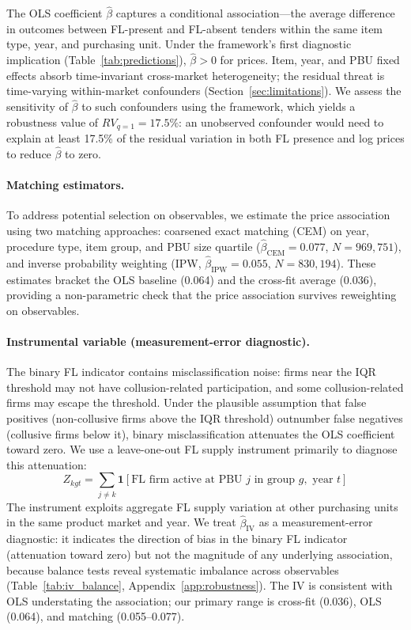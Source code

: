 The OLS coefficient $\hat{\beta}$ captures a conditional
association---the average difference in outcomes between FL-present and
FL-absent tenders within the same item type, year, and purchasing unit.
Under the framework's first diagnostic implication (Table~\ref{tab:predictions}), $\hat{\beta} > 0$ for prices.
Item, year, and PBU fixed effects absorb time-invariant cross-market
heterogeneity; the residual threat is time-varying within-market
confounders (Section~\ref{sec:limitations}). We assess the sensitivity
of $\hat{\beta}$ to such confounders using the
\citet{cinelli2020making} framework, which yields a robustness value
of $RV_{q=1} = 17.5\%$: an unobserved confounder would need to
explain at least 17.5\% of the residual variation in both FL presence
and log prices to reduce $\hat{\beta}$ to zero.

\paragraph{Matching estimators.}
To address potential selection on observables, we estimate the
price association using two matching approaches: coarsened exact
matching (CEM) on year, procedure type, item group, and PBU size
quartile ($\hat{\beta}_{\text{CEM}} = 0.077$, $N = 969{,}751$), and
inverse probability weighting (IPW, $\hat{\beta}_{\text{IPW}} = 0.055$,
$N = 830{,}194$). These estimates bracket the OLS baseline (0.064)
and the cross-fit average (0.036), providing a non-parametric check
that the price association survives reweighting on observables.

\paragraph{Instrumental variable (measurement-error diagnostic).}
The binary FL indicator contains misclassification noise: firms near
the IQR threshold may not have collusion-related participation, and
some collusion-related firms may escape the threshold. Under the plausible assumption that false positives (non-collusive
firms above the IQR threshold) outnumber false negatives (collusive
firms below it), binary misclassification attenuates the OLS
coefficient toward zero. We use a leave-one-out FL supply instrument
primarily to diagnose this attenuation:
\begin{equation}
  Z_{kgt} = \sum_{j \neq k} \mathbf{1}[\text{FL firm active at PBU } j
  \text{ in group } g, \text{ year } t]
  \label{eq:iv_v6}
\end{equation}
The instrument exploits aggregate FL supply variation at other
purchasing units in the same product market and year. We treat
$\hat{\beta}_{\text{IV}}$ as a measurement-error diagnostic: it
indicates the direction of bias in the binary FL indicator
(attenuation toward zero) but not the magnitude of any underlying association, because
balance tests reveal systematic imbalance across observables
(Table~\ref{tab:iv_balance}, Appendix~\ref{app:robustness}). The IV
is consistent with OLS understating the association; our primary range is
cross-fit (0.036), OLS (0.064), and matching (0.055--0.077).

